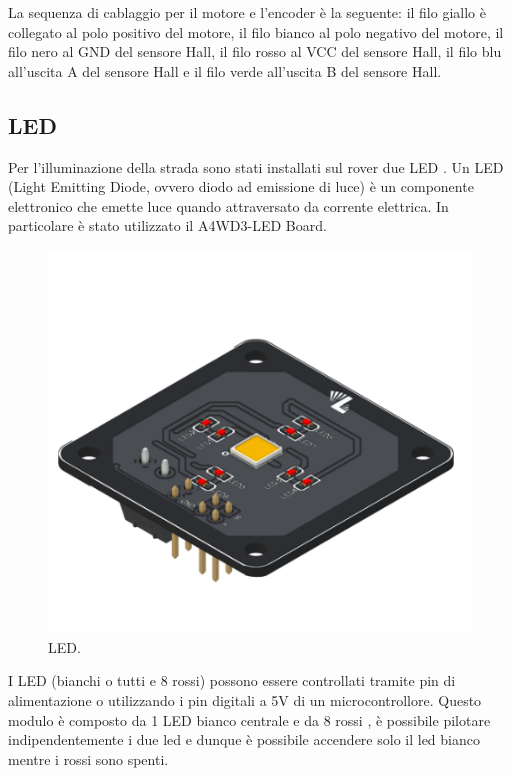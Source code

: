 \documentclass{article}
\begin{document}
La sequenza di cablaggio per il motore e l’encoder è la seguente: il filo giallo è collegato al polo positivo del motore, il filo bianco al polo negativo del motore, il filo nero al GND del sensore Hall, il filo rosso al VCC del sensore Hall, il filo blu all’uscita A del sensore Hall e il filo verde all’uscita B del sensore Hall.

\subsection{LED}
Per l'illuminazione della strada sono stati installati sul rover due LED .
Un LED (Light Emitting Diode, ovvero diodo ad emissione di luce) è un componente elettronico che emette luce quando attraversato da corrente elettrica.
In particolare è stato utilizzato il A4WD3-LED Board.
\begin{figure}[H]
\centering
\includegraphics[width=0.55\linewidth]{image/led.png}
\caption{\label{led:pot}LED.}
\end{figure}
 I LED (bianchi o tutti e 8 rossi) possono essere controllati tramite pin di alimentazione o utilizzando i pin digitali a 5V di un microcontrollore. Questo modulo è composto da 1 LED bianco centrale e da 8 rossi , è possibile pilotare indipendentemente i due led e dunque è possibile accendere solo il led bianco mentre i rossi sono spenti.
\newpage
\end{document}
